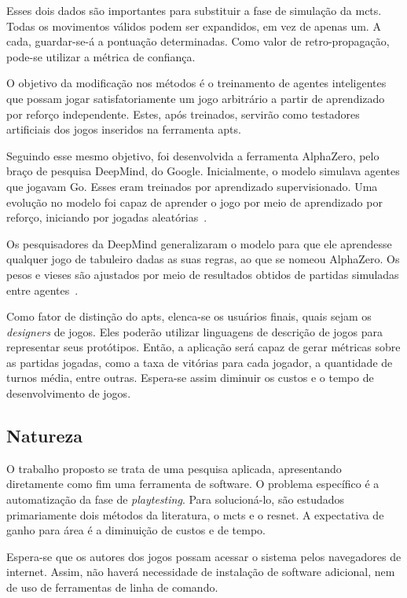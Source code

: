 \documentclass[12pt]{article}
\begin{document}
Esses dois dados são importantes para substituir a fase de simulação da \gls{mcts}.
Todas os movimentos válidos podem ser expandidos, em vez de apenas um.
A cada, guardar-se-á a pontuação determinadas.
Como valor de retro-propagação, pode-se utilizar a métrica de confiança.

O objetivo da modificação nos métodos é o treinamento de agentes inteligentes que possam jogar satisfatoriamente um jogo arbitrário a partir de aprendizado por reforço independente.
Estes, após treinados, servirão como testadores artificiais dos jogos inseridos na ferramenta \gls{apts}.

Seguindo esse mesmo objetivo, foi desenvolvida a ferramenta AlphaZero, pelo braço de pesquisa DeepMind, do Google.
Inicialmente, o modelo simulava agentes que jogavam Go.
Esses eram treinados por aprendizado supervisionado.
Uma evolução no modelo foi capaz de aprender o jogo por meio de aprendizado por reforço, iniciando por jogadas aleatórias~\cite{silverMasteringGameGo2016}.

Os pesquisadores da DeepMind generalizaram o modelo para que ele aprendesse qualquer jogo de tabuleiro dadas as suas regras, ao que se nomeou AlphaZero.
Os pesos e vieses são ajustados por meio de resultados obtidos de partidas simuladas entre agentes~\cite{alphazero-deepmind, silverGeneralReinforcementLearning2018}.

Como fator de distinção do \gls{apts}, elenca-se os usuários finais, quais sejam os \textit{designers} de jogos.
Eles poderão utilizar linguagens de descrição de jogos para representar seus protótipos.
Então, a aplicação será capaz de gerar métricas sobre as partidas jogadas, como a taxa de vitórias para cada jogador, a quantidade de turnos média, entre outras.
Espera-se assim diminuir os custos e o tempo de desenvolvimento de jogos.

\subsection{Natureza}

O trabalho proposto se trata de uma pesquisa aplicada, apresentando diretamente como fim uma ferramenta de software.
O problema específico é a automatização da fase de \textit{playtesting}.
Para solucioná-lo, são estudados primariamente dois métodos da literatura, o \gls{mcts} e o \gls{resnet}.
A expectativa de ganho para área é a diminuição de custos e de tempo.

Espera-se que os autores dos jogos possam acessar o sistema pelos navegadores de internet.
Assim, não haverá necessidade de instalação de software adicional, nem de uso de ferramentas de linha de comando.
\end{document}
